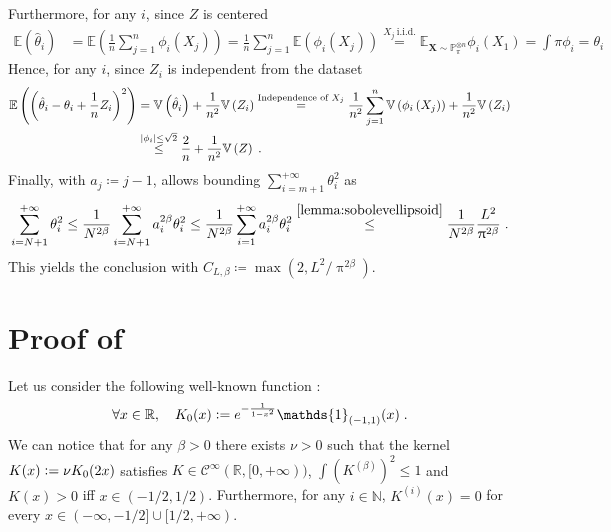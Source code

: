 \documentclass[10pt]{article} %
\def\Ind{\mathds{1}}
\newcommand{\R}[0]{\mathbb{R}}
\newcommand{\N}[0]{\mathbb{N}}
\newcommand{\Prob}[0]{\mathbb{P}}
\newcommand{\E}[0]{\mathbb{E}}
\newcommand{\V}[0]{\mathbb{V}}
\newcommand{\eqdef}{\vcentcolon=}
\newcommand\vect[1]{\mathbf{#1}}
\newcommand\p[1]{\left( {#1}\right)}
\newcommand\RG[1]{\textcolor{red}{#1}}
\newcommand\mRG[1]{\marginpar{\tiny\RG{#1}}}
\newcommand\B[1]{{#1}}
\begin{document}
Furthermore, for any $i$, since $Z$ is centered
\begin{equation*}
    \begin{aligned}
        \E \p{\hat{\theta}_i} 
        &= 
        \E \p{\frac{1}{n} \sum_{j=1}^n \phi_i(X_j)}
        =
        \frac{1}{n} \sum_{j=1}^n \E \p{\phi_i(X_j)} 
        \stackrel{X_j\ \mathrm{i.i.d.}}{=} \E_{\vect{X} \sim \Prob_{\pi}^{\otimes n}} \phi_i(X_1) = \int \pi \phi_i = \theta_i
    \end{aligned}
\end{equation*}
Hence, for any $i$, since $Z_i$ is independent from the dataset
\begin{equation*}
    \begin{aligned}
        \E \p{\p{\hat{\theta}_i -\theta_i + \frac{1}{n} Z_i}^2}
        &= 
        \V \p{\hat{\theta}_i} + \frac{1}{n^2} \V \p{Z_i} 
        \stackrel{\text{Independence of $X_j$}}{=}
        \frac{1}{n^2} \sum_{j=1}^n \V \p{\phi_i \p{X_j}} + \frac{1}{n^2} \V \p{Z_i} \\
        &\stackrel{|\phi_i| \leq \sqrt{2}}{\leq}
        \frac{%
        2}{n}+ \frac{1}{n^2} \V \p{Z} \;.
    \end{aligned}
\end{equation*}
Finally, with $a_j \coloneqq j-1$,  allows bounding $\sum_{i=m+1}^{+\infty} \theta_i^2$ as
\begin{equation*}
    \sum_{i=N+1}^{+\infty} \theta_i^2 \leq \frac{1}{N^{2 \beta}} \sum_{i=N+1}^{+\infty} a_i^{2\beta} \theta_i^2 \leq \frac{1}{N^{2 \beta}} \sum_{i=1}^{+\infty} a_i^{2\beta} \theta_i^2 \stackrel{\Cref{lemma:sobolevellipsoid}}{\leq} \frac{1}{N^{2 \beta}} \frac{L^2}{\B{\uppi}^{2 \beta}} \;.
\end{equation*}
This yields the conclusion with $C_{L,\beta} \coloneqq \max(2, L^2/\B{\uppi}^{2\beta})$.

\section{Proof of  }
\label{proofofth:sidp}

Let us consider the following well-known function :
\begin{equation*}
    \forall x \in \R, \quad K_0(x) \eqdef e^{- \frac{1}{1 - x^2}}\Ind_{(-1, 1)}(x) \;.
\end{equation*}
We can notice that for any $\beta>0$ there exists $\nu > 0$ such that the kernel $K(x) \eqdef \nu K_0(2x)$ satisfies $K \in \mathcal{C}^{\infty}(\R, [0, +\infty))$, $\int \p{K^{(\beta)}}^2 \leq 1$  %
and $K(x)>0$ iff $x \in (-1/2, 1/2)$. Furthermore, for any $i \in \N$, $K^{(i)}(x) = 0$ for every $x \in (-\infty, -1/2] \cup [1/2, +\infty)$.
\end{document}
